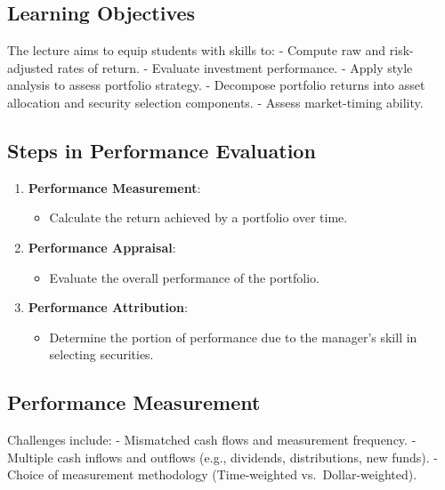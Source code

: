 \documentclass[
]{book}
\providecommand{\tightlist}{%
  \setlength{\itemsep}{0pt}\setlength{\parskip}{0pt}}
\begin{document}
\hypertarget{learning-objectives-2}{%
\subsection{Learning Objectives}\label{learning-objectives-2}}

The lecture aims to equip students with skills to:
- Compute raw and risk-adjusted rates of return.
- Evaluate investment performance.
- Apply style analysis to assess portfolio strategy.
- Decompose portfolio returns into asset allocation and security selection components.
- Assess market-timing ability.

\hypertarget{steps-in-performance-evaluation}{%
\subsection{Steps in Performance Evaluation}\label{steps-in-performance-evaluation}}

\begin{enumerate}
\def\labelenumi{\arabic{enumi}.}
\tightlist
\item
  \textbf{Performance Measurement}:

  \begin{itemize}
  \tightlist
  \item
    Calculate the return achieved by a portfolio over time.
  \end{itemize}
\item
  \textbf{Performance Appraisal}:

  \begin{itemize}
  \tightlist
  \item
    Evaluate the overall performance of the portfolio.
  \end{itemize}
\item
  \textbf{Performance Attribution}:

  \begin{itemize}
  \tightlist
  \item
    Determine the portion of performance due to the manager's skill in selecting securities.
  \end{itemize}
\end{enumerate}

\hypertarget{performance-measurement}{%
\subsection{Performance Measurement}\label{performance-measurement}}

Challenges include:
- Mismatched cash flows and measurement frequency.
- Multiple cash inflows and outflows (e.g., dividends, distributions, new funds).
- Choice of measurement methodology (Time-weighted vs.~Dollar-weighted).
\end{document}
